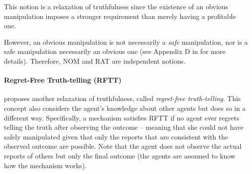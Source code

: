 This notion is a relaxation of truthfulness since the existence of an obvious manipulation imposes a stronger requirement than merely having a profitable one.
\iffalse
Specifically, suppose there exists a manipulation whose best-case utility (i.e., under the most favorable profile of the other agents) is strictly higher than the best-case utility of truthful reporting. Then, in the profile that maximizes the manipulator’s utility when manipulating, the utility from truthful reporting is at most the best-case truthful utility. Since this value is strictly lower than the utility obtained by manipulating in that same profile, it follows that the agent strictly prefers to manipulate. Thus, if a mechanism is not NOM, it necessarily admits some profitable manipulation, implying that it is not truthful.
\fi
{}

However, an obvious manipulation is not necessarily a \emph{safe} manipulation, nor is a safe manipulation necessarily an obvious one (see Appendix D in \cite{BU2023Rat} for more details). Therefore, NOM and RAT are independent notions.







\paragraph{Regret-Free Truth-telling (RFTT)} \citet{regret2018Fernandez} proposes another relaxation of truthfulness, called \emph{regret-free truth-telling}. This concept also considers the agent’s knowledge about other agents but does so in a different way.
Specifically, a mechanism satisfies RFTT if no agent ever regrets telling the truth after observing the outcome -- meaning that she could not have safely manipulated given that only the reports that are consistent with the observed outcome are possible.
Note that the agent does not observe the actual reports of others but only the final outcome (the agents are assumed to know how the mechanism works).




